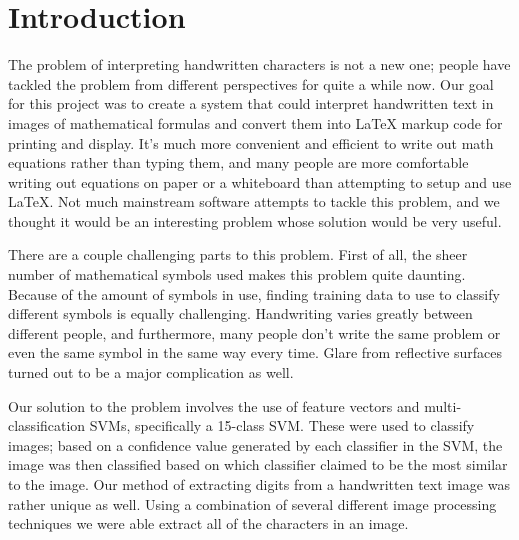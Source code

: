 \section{Introduction}

The problem of interpreting handwritten characters is not a new one; people have tackled the problem from different perspectives for quite a while now.  Our goal for this project was to create a system that could interpret handwritten text in images of mathematical formulas and convert them into LaTeX markup code for printing and display.  It's much more convenient and efficient to write out math equations rather than typing them, and many people are more comfortable writing out equations on paper or a whiteboard than attempting to setup and use LaTeX.  Not much mainstream software attempts to tackle this problem, and we thought it would be an interesting problem whose solution would be very useful.


There are a couple challenging parts to this problem.  First of all, the sheer number of mathematical symbols used makes this problem quite daunting.  Because of the amount of symbols in use, finding training data to use to classify different symbols is equally challenging. Handwriting varies greatly between different people, and furthermore, many people don't write the same problem or even the same symbol in the same way every time.  Glare from reflective surfaces turned out to be a major complication as well.

Our solution to the problem involves the use of feature vectors and multi-classification SVMs, specifically a 15-class SVM.  These were used to classify images; based on a confidence value generated by each classifier in the SVM, the image was then classified based on which classifier claimed to be the most similar to the image.  Our method of extracting digits from a handwritten text image was rather unique as well. Using a combination of several different image processing techniques we were able extract all of the characters in an image.